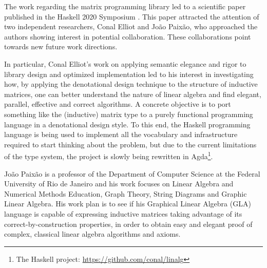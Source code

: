 \documentclass[
  oneside,
  11pt, a4paper,
  footinclude=true,
  headinclude=true,
  cleardoublepage=empty
]{scrbook}
\theoremstyle{definition}
\theoremstyle{definition}
\begin{document}
	    The work regarding the matrix programming library led to a scientific paper published in the Haskell 2020 Symposium \citep{Armando2020}. This paper attracted the attention of 
	    two independent researchers, Conal Elliot and João Paixão, who approached the authors showing interest in potential collaboration. These collaborations point towards new future work directions.
	    
	    In particular, Conal Elliot's work on applying semantic elegance and rigor to library design and optimized implementation led to his interest in investigating how, by applying the denotational design technique to the structure of inductive matrices, one can better understand the nature of linear algebra and find elegant, parallel, effective and correct algorithms. A concrete objective is to port something like the (inductive) matrix type to a purely functional programming language in a denotational design style. To this end, the Haskell programming language is being used to implement all the vocabulary and infrastructure required to start thinking about the problem, but due to the current limitations of the type system, the project is slowly being rewritten in Agda\footnote{The Haskell project: \href{https://github.com/conal/linalg}{https://github.com/conal/linalg}}.
	    
	    João Paixão is a professor of the Department of Computer Science at the Federal University of Rio de Janeiro and his work focuses on Linear Algebra and Numerical Methods Education, Graph Theory, String Diagrams and Graphic Linear Algebra. His work plan is to see if his Graphical Linear Algebra (GLA) language \citep{paixao2020calculational} is capable of expressing inductive matrices taking advantage of its correct-by-construction properties, in order to obtain easy and elegant proof of complex, classical linear algebra algorithms and axioms.
	     

	

	
	
	
\end{document}

